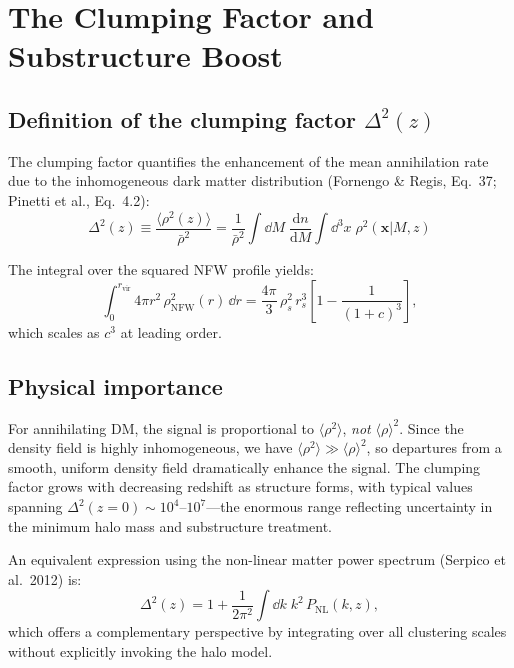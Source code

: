 \documentclass[10pt,a4paper]{article}
\newcommand{\vect}[1]{\mathbf{#1}}
\newcommand{\ddn}{\frac{\mathrm{d}n}{\mathrm{d}M}}
\newcommand{\rhobar}{\bar{\rho}}
\begin{document}
\section{The Clumping Factor and Substructure Boost}
\label{sec:part4}

\subsection{Definition of the clumping factor $\Delta^2(z)$}

The clumping factor quantifies the enhancement of the mean annihilation rate due to the inhomogeneous dark matter distribution (Fornengo \& Regis, Eq.~37; Pinetti et al., Eq.~4.2):
\begin{equation}
\label{eq:clumping}
\boxed{
\Delta^2(z) \equiv \frac{\langle \rho^2(z) \rangle}{\rhobar^2} = \frac{1}{\rhobar^2} \int \dd M \; \ddn \int \dd^3 x \; \rho^2(\vect{x} | M, z)
}
\end{equation}

The integral over the squared NFW profile yields:
\begin{equation}
\int_0^{r_{\mathrm{vir}}} 4\pi r^2 \, \rho_{\mathrm{NFW}}^2(r) \, \dd r = \frac{4\pi}{3} \, \rho_s^2 \, r_s^3 \left[1 - \frac{1}{(1 + c)^3}\right],
\end{equation}
which scales as $c^3$ at leading order.

\subsection{Physical importance}

For annihilating DM, the signal is proportional to $\langle \rho^2 \rangle$, \textit{not} $\langle \rho \rangle^2$. Since the density field is highly inhomogeneous, we have $\langle \rho^2 \rangle \gg \langle \rho \rangle^2$, so departures from a smooth, uniform density field dramatically enhance the signal. The clumping factor grows with decreasing redshift as structure forms, with typical values spanning $\Delta^2(z = 0) \sim 10^4$--$10^7$---the enormous range reflecting uncertainty in the minimum halo mass and substructure treatment.

An equivalent expression using the non-linear matter power spectrum (Serpico et al.\ 2012) is:
\begin{equation}
\Delta^2(z) = 1 + \frac{1}{2\pi^2} \int \dd k \; k^2 \, P_{\mathrm{NL}}(k, z),
\end{equation}
which offers a complementary perspective by integrating over all clustering scales without explicitly invoking the halo model.
\end{document}
